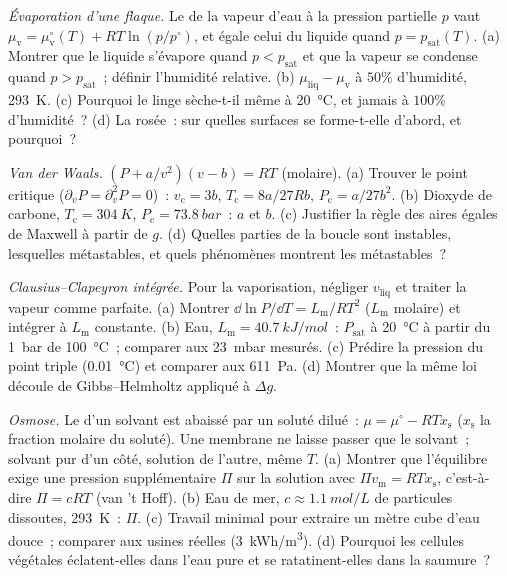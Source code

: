 \begin{exercise}[$\star\star$]\label{exo:b2:thermodynamic-potentials:8}
\emph{Évaporation d'une flaque.} Le  de la vapeur d'eau
à la pression partielle $p$ vaut $\mu_{\text{v}} = \mu_{\text{v}}^\circ(T) +
RT\ln(p/p^\circ)$, et égale celui du liquide quand $p = p_{\text{sat}}(T)$.
(a) Montrer que le liquide s'évapore quand $p < p_{\text{sat}}$ et que la vapeur
se condense quand $p > p_{\text{sat}}$~; définir l'humidité relative. (b)
$\mu_{\text{liq}} - \mu_{\text{v}}$ à $50\%$ d'humidité, \qty{293}{K}. (c) Pourquoi
le linge sèche-t-il même à \qty{20}{\celsius}, et jamais à $100\%$ d'humidité~?
(d) La rosée~: sur quelles surfaces se forme-t-elle d'abord, et pourquoi~?
\end{exercise}

\begin{exercise}[$\star\star$]\label{exo:b2:thermodynamic-potentials:9}
\emph{Van der Waals.} $(P + a/v^2)(v - b) = RT$ (molaire). (a) Trouver le
point critique ($\partial_vP = \partial_v^2P = 0$)~: $v_{\text{c}} = 3b$,
$T_{\text{c}} = 8a/27Rb$, $P_{\text{c}} = a/27b^2$. (b) Dioxyde de carbone,
$T_{\text{c}} = \qty{304}{K}$, $P_{\text{c}} = \qty{73.8}{bar}$~: $a$ et $b$. (c)
Justifier la règle des aires égales de Maxwell à partir de $g$. (d) Quelles parties de la boucle
sont instables, lesquelles métastables, et quels phénomènes montrent les
métastables~?
\end{exercise}

\begin{exercise}[$\star\star\star$]\label{exo:b2:thermodynamic-potentials:10}
\emph{Clausius--Clapeyron intégrée.} Pour la vaporisation, négliger $v_{\text{liq}}$
et traiter la vapeur comme parfaite. (a) Montrer $\dd\ln P/\dd T = L_{\text{m}}/RT^2$
($L_{\text{m}}$ molaire) et intégrer à $L_{\text{m}}$ constante. (b) Eau,
$L_{\text{m}} = \qty{40.7}{kJ/mol}$~: $P_{\text{sat}}$ à \qty{20}{\celsius} à partir du
\qty{1}{bar} de \qty{100}{\celsius}~; comparer aux \qty{23}{mbar} mesurés.
(c) Prédire la pression du point triple (\qty{0.01}{\celsius}) et comparer
aux \qty{611}{Pa}. (d) Montrer que la même loi découle de Gibbs--Helmholtz
appliqué à $\Delta g$.
\end{exercise}

\begin{exercise}[$\star\star\star$]\label{exo:b2:thermodynamic-potentials:11}
\emph{Osmose.} Le  d'un solvant est abaissé par un soluté
dilué~: $\mu = \mu^\circ - RTx_{\text{s}}$ ($x_{\text{s}}$ la fraction molaire du
soluté). Une membrane ne laisse passer que le solvant~; solvant pur
d'un côté, solution de l'autre, même $T$. (a) Montrer que l'équilibre
exige une pression supplémentaire $\Pi$ sur la solution avec $\Pi v_{\text{m}} =
RTx_{\text{s}}$, c'est-à-dire $\Pi = cRT$ (van 't Hoff). (b) Eau de mer, $c \approx
\qty{1.1}{mol/L}$ de particules dissoutes, \qty{293}{K}~: $\Pi$. (c) Travail minimal
pour extraire un mètre cube d'eau douce~; comparer aux usines réelles
(\qty{3}{kWh/m^3}). (d) Pourquoi les cellules végétales éclatent-elles dans l'eau pure et
se ratatinent-elles dans la saumure~?
\end{exercise}

